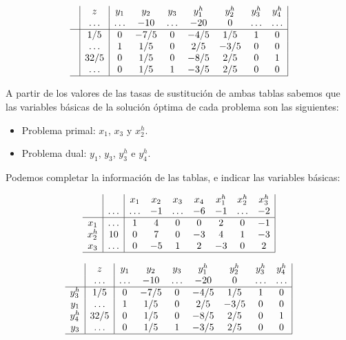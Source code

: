 \begin{enumerate}[label=\alph*)]
    \[
    \begin{array}{c|c|ccccccc|}
           & z      & y_1    & y_2 & y_3    & y^h_1 & y^h_2 & y^h_3  & y^h_4\\ 
           & \ldots & \ldots & -10 & \ldots & -20   & 0     & \ldots & \ldots \\ 
    \hline
           & 1/5       & 0   & -7/5   & 0      & -4/5  & 1/5   & 1      & 0\\ 
           & \ldots    & 1   & 1/5    & 0      & 2/5   & -3/5  & 0      & 0\\ 
           & 32/5      & 0   & 1/5    & 0      & -8/5  & 2/5   & 0      & 1\\ 
        & \ldots    & 0   & 1/5    & 1      & -3/5  & 2/5   & 0      & 0\\ 
    \hline
    \end{array}
    \]

    A partir de los valores de las tasas de sustitución de ambas tablas sabemos que las variables básicas de la solución óptima de cada problema son las siguientes:
    \begin{itemize}
        \item Problema primal: $x_1$, $x_3$ y $x^h_2$.
        \item Problema dual: $y_1$, $y_3$, $y^h_3$ e $y^h_4$.
    \end{itemize}

    Podemos completar la información de las tablas, e indicar las variables básicas:
    
        \[
    \begin{array}{c|c|ccccccc|}
          &        & x_1    & x_2 & x_3    & x_4 & x^h_1 & x^h_2  & x^h_3\\ 
          & \ldots & \ldots & -1  & \ldots & -6  & -1    & \ldots & -2 \\ 
    \hline
    x_1   & \ldots & 1      & 4   & 0      & 0   & 2     & 0      & -1\\ 
    x^h_2 & 10     & 0      & 7   & 0      & -3  & 4     & 1      & -3\\ 
    x_3   & \ldots & 0      & -5  & 1      & 2   & -3    & 0      & 2\\ 
    \hline
    \end{array}
    \]
    
    \[
    \begin{array}{c|c|ccccccc|}
           & z      & y_1    & y_2 & y_3    & y^h_1 & y^h_2 & y^h_3  & y^h_4\\ 
           & \ldots & \ldots & -10 & \ldots & -20   & 0     & \ldots & \ldots \\ 
    \hline
    y^h_3  & 1/5       & 0   & -7/5   & 0      & -4/5  & 1/5   & 1      & 0\\ 
    y_1    & \ldots    & 1   & 1/5    & 0      & 2/5   & -3/5  & 0      & 0\\ 
    y^h_4  & 32/5      & 0   & 1/5    & 0      & -8/5  & 2/5   & 0      & 1\\ 
    y_3    & \ldots    & 0   & 1/5    & 1      & -3/5  & 2/5   & 0      & 0\\ 
    \hline
    \end{array}
    \]


\end{enumerate}
